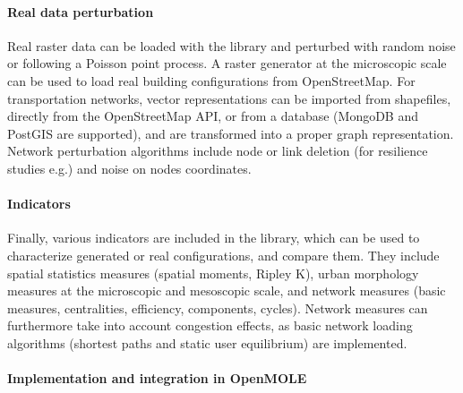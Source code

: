 \documentclass[11pt]{article}
\begin{document}
\paragraph{Real data perturbation}

Real raster data can be loaded with the library and perturbed with random noise or following a Poisson point process. A raster generator at the microscopic scale can be used to load real building configurations from OpenStreetMap. For transportation networks, vector representations can be imported from shapefiles, directly from the OpenStreetMap API, or from a database (MongoDB and PostGIS are supported), and are transformed into a proper graph representation. Network perturbation algorithms include node or link deletion (for resilience studies e.g.) and noise on nodes coordinates.


\paragraph{Indicators}

Finally, various indicators are included in the library, which can be used to characterize generated or real configurations, and compare them. They include spatial statistics measures (spatial moments, Ripley K), urban morphology measures at the microscopic and mesoscopic scale, and network measures (basic measures, centralities, efficiency, components, cycles). Network measures can furthermore take into account congestion effects, as basic network loading algorithms (shortest paths and static user equilibrium) are implemented.



\paragraph{Implementation and integration in OpenMOLE}
\end{document}
